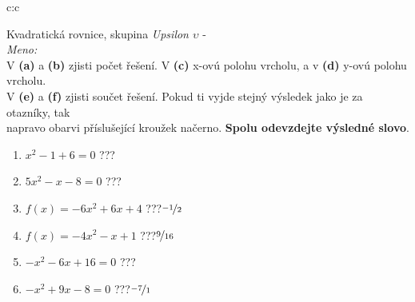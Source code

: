 \documentclass[10pt]{report}
\begin{document}
\clearpage
\thispagestyle{empty}
\begin{tabular}{c:c}
\begin{minipage}[c][99mm][t]{0.49\linewidth}
\begin{center}
\vspace{7mm}
{\huge Kvadratická rovnice, skupina \textit{Upsilon $\upsilon$} -}\\[4.5mm]
\textit{Meno:}\phantom{xxxxxxxxxxxxxxxxxxxxxxxxxxxxxxxxxxxxxxxxxxxxxxxxxxxxxxxxxxxxxxxxx}\\[3.5mm]
V \textbf{(a)} a \textbf{(b)} zjisti počet řešení. V \textbf{(c)} x-ovú polohu vrcholu, a v \textbf{(d)} y-ovú polohu vrcholu.\\V \textbf{(e)} a \textbf{(f)} zjisti součet řešení. Pokud ti vyjde stejný výsledek jako je za otazníky, tak\\napravo obarvi příslušející kroužek načerno. \textbf{Spolu odevzdejte výsledné slovo}.\\[3mm]
\begin{minipage}{0.77\linewidth}
\begin{center}
\begin{varwidth}{\textwidth}
\begin{enumerate}
\large
\item $x^2-1+6=0$\quad \dotfill\; ???\;\dotfill {}
\item $5x^2-x-8=0$\quad \dotfill\; ???\;\dotfill {}
\item $f(x)=-6x^2+6x+4$\quad \dotfill\; ???\;\dotfill \quad $\nicefrac{-1}{2}$
\item $f(x)=-4x^2-x+1$\quad \dotfill\; ???\;\dotfill \quad $\nicefrac{9}{16}$
\item $-x^2-6x+16=0$\quad \dotfill\; ???\;\dotfill {}
\item $-x^2+9x-8=0$\quad \dotfill\; ???\;\dotfill \quad $\nicefrac{-7}{1}$
\end{enumerate}
\end{varwidth}
\end{center}
\end{minipage}

\end{center}
\end{minipage}
\end{tabular}
\end{document}
